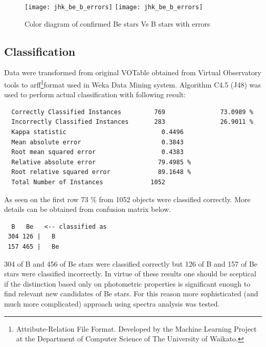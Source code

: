     \begin{figure}[!htbp]
      \begin{center}
        \leavevmode
        \ifpdf
        \texttt{[image: jhk\_be\_b\_errors]}
        \else
        \texttt{[image: jhk\_be\_b\_errors]}
        \fi
        \caption{Color diagram of confirmed Be stars Vs B stars with errors}
        \label{Figjhk_be_b_errors}
      \end{center}
    \end{figure}

\clearpage


\subsection{Classification}
Data were transformed from original VOTable obtained from Virtual
Observatory tools to arff\footnote{Attribute-Relation File
  Format. Developed by the Machine Learning Project at the Department
  of Computer Science of The University of Waikato.}format used in
Weka Data Mining system. Algorithm C4.5 (J48) was used to perform
actual classification with following result:

\begin{lstlisting}
  Correctly Classified Instances         769               73.0989 %
  Incorrectly Classified Instances       283               26.9011 %
  Kappa statistic                          0.4496
  Mean absolute error                      0.3843
  Root mean squared error                  0.4383
  Relative absolute error                 79.4985 %
  Root relative squared error             89.1648 %
  Total Number of Instances             1052
\end{lstlisting}

As seen on the first row 73 \% from  1052 objects were classified
correctly. More details can be obtained from confusion matrix below.

\begin{lstlisting}
  B   Be   <-- classified as
 304 126 |   B
 157 465 |   Be
\end{lstlisting}

304 of B and 456 of Be stars were classified correctly but 126 of B
and 157 of Be stars were classified incorrectly. In virtue of these
results one should be sceptical if the distinction based only on
photometric properties is significant enough to find relevant new
candidates of Be stars. For this reason more sophisticated (and much
more complicated) approach using spectra analysis was tested.

